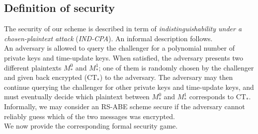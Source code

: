 \documentclass[a4paper,10pt]{article}
\begin{document}
	\subsection{Definition of security}
	\label{security.sec}
	The security of our scheme is described in term of \emph{indistinguishability under a chosen-plaintext attack} (\emph{IND-CPA}).
	An informal description follows.\\
	An adversary is allowed to query the challenger for a polynomial number of private keys and time-update keys. When satisfied, the adversary presents two different plaintexts $M_*^0$ and $M_*^1$; one of them is randomly chosen by the challenger and given back encrypted ($\mathrm{CT}_*$) to the adversary. The adversary may then continue querying the challenger for other private keys and time-update keys, and must eventually decide which plaintext between $M_*^0$ and $M_*^1$ corresponds to $\mathrm{CT}_*$. Informally, we may consider an RS-ABE scheme secure if the adversary cannot reliably guess which of the two messages was encrypted.\\
	We now provide the corresponding formal security game.
\end{document}
